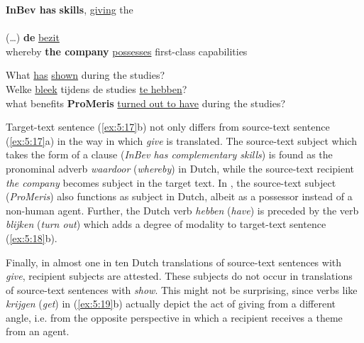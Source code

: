 \documentclass[output=paper]{LSP/langsci}
\begin{document}
\ea \label{ex:5:17}
\ea
\textbf{InBev has}  \textbf{skills}, \ul{giving} the \\ \,  \\[1em]
\ex
(\dots)  \textbf{de}   \ul{bezit}\\
whereby \textbf{the company} \ul{possesses} first-class capabilities
\z
\z


\ea \label{ex:5:18}
\ea What  \ul{has}  \ul{shown} during the studies?\\[1em]
\ex Welke  \ul{bleek}  tijdens de studies \ul{te hebben}?\\
what benefits \textbf{ProMeris} \ul{turned out to have} during the studies?
\z
\z




Target-text sentence (\ref{ex:5:17}b) not only differs from source-text sentence (\ref{ex:5:17}a) in the way in which \textit{give} is translated. The source-text subject which takes the form of a clause (\textit{InBev has complementary skills}) is found as the pronominal adverb \textit{waardoor} (\textit{whereby}) in Dutch, while the source-text recipient \textit{the company} becomes subject in the target text. In , the source-text subject (\textit{ProMeris}) also functions as subject in Dutch, albeit as a possessor instead of a non-human agent. Further, the Dutch verb \textit{hebben} (\textit{have}) is preceded by the verb \textit{blijken} (\textit{turn out}) which adds a degree of modality to target-text sentence (\ref{ex:5:18}b). 

Finally, in almost one in ten Dutch translations of source-text sentences with \textit{give}, recipient subjects are attested. These subjects do not occur in translations of source-text sentences with \textit{show}. This might not be surprising, since verbs like \textit{krijgen} (\textit{get}) in (\ref{ex:5:19}b) actually depict the act of giving from a different angle, i.e. from the opposite perspective in which a recipient receives a theme from an agent.   
\end{document}
